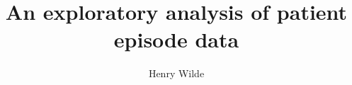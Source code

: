 \documentclass{beamer}
\title{An exploratory analysis of patient episode data}
\author{Henry Wilde}
\institute{Cardiff University School of Mathematics}
\begin{document}
\begin{frame}
\titlepage%
\end{frame}





\end{document}
